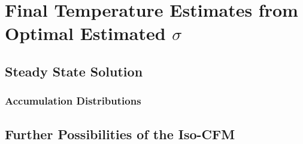 \documentclass[../../CompleteThesis2/Complete_2ndDraft]{subfiles}
\begin{document}
\section[Temperature Estimates from Data]{Final Temperature Estimates from Optimal Estimated $\sigma$}
\label{Sec:Results_TempEstData}

\subsection[Steady State Solution]{Steady State Solution}
\label{Sec:Results_TempEstData_StSt}

\subsubsection[Accumulation Distributions]{Accumulation Distributions}
\label{Sec:Results_TempEstData_StSt_AccumDists}

\subsection[Iso-CFM Possibilities]{Further Possibilities of the Iso-CFM}
\label{Sec:Results_TempEstData_IsoCFMPossibilities}
\end{document}
